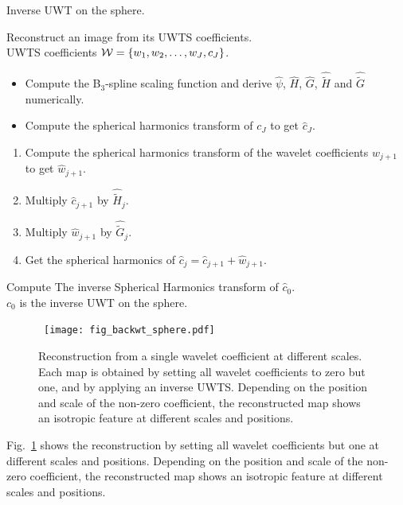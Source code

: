 {\linespread{1}
\begin{algorithm}[h]
\caption{Inverse UWT on the sphere.}
\label{algo_iuwts}
 Reconstruct an image from its UWTS coefficients.\\
 UWTS coefficients ${\cal W}=\{w_1, w_2, \dots, w_{J}, c_{J}\}$.\\
\begin{itemize}
\item Compute the B$_3$-spline scaling function and derive $\hat{\psi}$, $\widehat{H}$, $\widehat{G}$, $\widehat{\tilde H}$ and $\widehat{\tilde G}$ numerically.
\item Compute the spherical harmonics transform of $c_J$ to get ${\hat c}_J$.
\end{itemize}
 {
\begin{enumerate}[1.]
\item Compute the spherical harmonics transform of the wavelet coefficients $w_{j+1}$ to get $\hat{w}_{j+1}$.
\item Multiply $\hat{c}_{j+1}$ by ${\widehat {\tilde H}}_{j}$.
\item Multiply $\hat{w}_{j+1}$ by ${\widehat {\tilde G}}_{j}$.
\item Get the spherical harmonics of $\hat{c}_j=\hat{c}_{j+1}+\hat{w}_{j+1}$.
\end{enumerate}
}
Compute The inverse Spherical Harmonics transform of $\hat c_0$.\\
 $c_0$ is the inverse UWT on the sphere.
\end{algorithm}

\begin{figure}[htb]
\centerline{
\hbox{
\texttt{[image: fig\_backwt\_sphere.pdf]}
}}
\caption{Reconstruction from a single wavelet coefficient at different scales. Each map is obtained by setting all wavelet coefficients to zero but one, and by applying an inverse UWTS. Depending on the position and scale of the non-zero coefficient, the reconstructed map shows an isotropic feature 
at different scales and positions.}
\label{Figure:back_wt}
\end{figure}
}
Fig.~\ref{Figure:back_wt} shows the reconstruction by setting all wavelet coefficients but one at different scales and positions. 
Depending on the position and scale of the non-zero coefficient, the reconstructed map shows an isotropic feature at different scales and positions.
 

